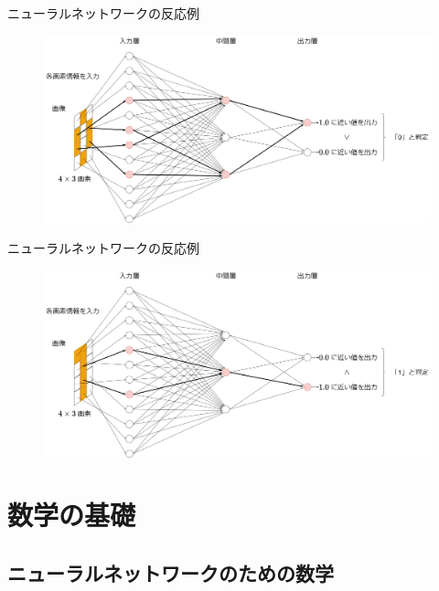 \documentclass[dvipdfmx,aspectratio=169]{beamer}
\begin{document}
	\begin{frame}{ニューラルネットワークの反応例}
		\begin{figure}
			\centering
			\includegraphics[width=0.7\linewidth]{img/example-of-response-of-neural-network-when-0-is-input}
		\end{figure}
	\end{frame}
	\begin{frame}{ニューラルネットワークの反応例}
		\begin{figure}
			\centering
			\includegraphics[width=0.7\linewidth]{img/example-of-response-of-neural-network-when-1-is-input}
		\end{figure}
	\end{frame}
	
	\section{数学の基礎}
	\subsection{ニューラルネットワークのための数学}
\end{document}

